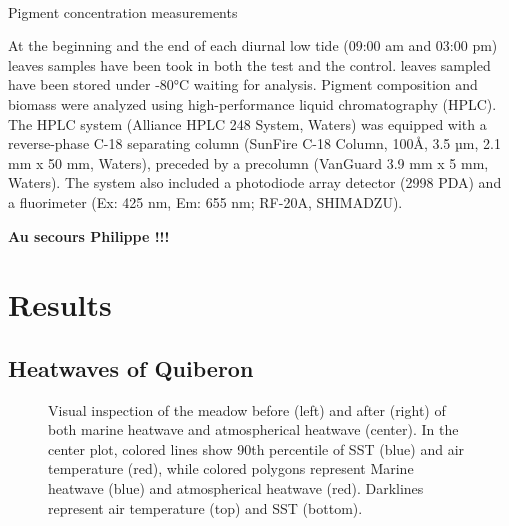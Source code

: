 \documentclass[
  number]{elsarticle}
\makeatletter
\let\oldparagraph\paragraph
\renewcommand{\paragraph}{
    \@ifstar
      \xxxParagraphStar
      \xxxParagraphNoStar
  }
\newcommand{\xxxParagraphStar}[1]{\oldparagraph*{#1}\mbox{}}
\newcommand{\xxxParagraphNoStar}[1]{\oldparagraph{#1}\mbox{}}
\makeatother
\begin{document}
\paragraph{Pigment concentration
measurements}\label{pigment-concentration-measurements}

At the beginning and the end of each diurnal low tide (09:00 am and
03:00 pm) leaves samples have been took in both the test and the
control. leaves sampled have been stored under -80°C waiting for
analysis. Pigment composition and biomass were analyzed using
high-performance liquid chromatography (HPLC). The HPLC system (Alliance
HPLC 248 System, Waters) was equipped with a reverse-phase C-18
separating column (SunFire C-18 Column, 100Å, 3.5 µm, 2.1 mm x 50 mm,
Waters), preceded by a precolumn (VanGuard 3.9 mm x 5 mm, Waters). The
system also included a photodiode array detector (2998 PDA) and a
fluorimeter (Ex: 425 nm, Em: 655 nm; RF-20A, SHIMADZU).

\textbf{Au secours Philippe !!!}

\section{Results}\label{results}

\subsection{Heatwaves of Quiberon}\label{heatwaves-of-quiberon}

\label{cell-fig-Temp_plot_S2}
\begin{figure}[H]


\caption{\label{fig-Temp_plot_S2}Visual inspection of the meadow before
(left) and after (right) of both marine heatwave and atmospherical
heatwave (center). In the center plot, colored lines show 90th
percentile of SST (blue) and air temperature (red), while colored
polygons represent Marine heatwave (blue) and atmospherical heatwave
(red). Darklines represent air temperature (top) and SST (bottom).}

\end{figure}%
\end{document}
